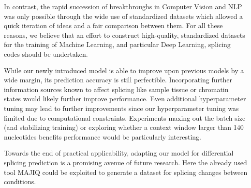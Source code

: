 In contrast, the rapid succession of breakthroughs in Computer Vision and NLP was only possible through the wide use of standardized datasets which allowed a quick iteration of ideas and a fair comparison between them. For all these reasons, we believe that an effort to construct high-quality, standardized datasets for the training of Machine Learning, and particular Deep Learning, splicing codes should be undertaken. 




While our newly introduced model is able to improve upon previous models by a wide margin, its prediction accuracy is still perfectible. Incorporating further information sources known to affect splicing like sample tissue or chromatin states \cite{chromatin} would likely further improve performance. 
Even additional hyperparameter tuning may lead to further improvements since our hyperparameter tuning was limited due to computational constraints. Experiments maxing out the batch size (and stabilizing training) or exploring whether a context window larger than 140 nucleotides benefits performance would be particularly interesting. 

Towards the end of practical applicability, adapting our model for differential splicing prediction is a promising avenue of future research. Here the already used tool MAJIQ could be exploited to generate a dataset for splicing changes between conditions. 


%
%
% 
%
%
